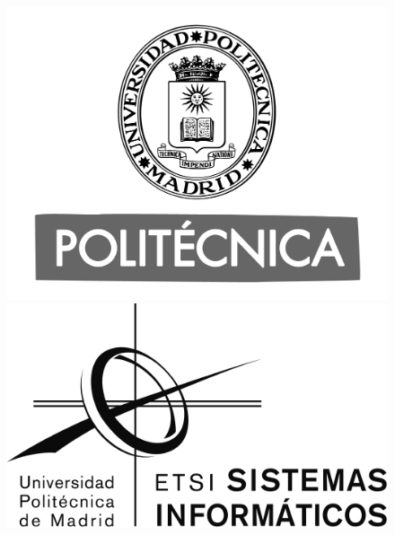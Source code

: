 \documentclass[a4paper]{report}
\begin{document}
\sloppy 
\begin{titlepage}
\pagecolor{AzulCeleste}\afterpage{\nopagecolor}

\begin{figure}[!htb]
   \begin{minipage}{0.5\textwidth}
     \centering
     \includegraphics[width=1\textwidth]{logo_upm_bn.png}
   \end{minipage}\hfill
   \begin{minipage}{0.5\textwidth}
     \centering
     \includegraphics[width=1\textwidth]{logo_etsisi_bn.png}
   \end{minipage}
\end{figure}


\end{titlepage}
\end{document}
